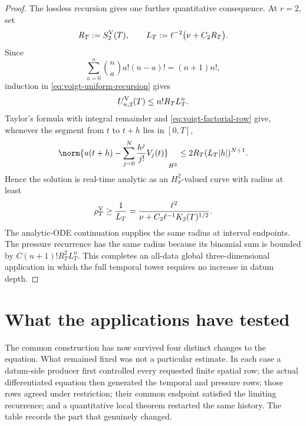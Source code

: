 \begin{proof}
The lossless recursion gives one further quantitative consequence.  At
\(r=2\), set
\begin{equation}
 R_T:=S_2^{\rm V}(T),
 \qquad
 L_T:=\ell^{-2}\bigl(\nu+C_2R_T\bigr).
 \label{eq:voigt-analytic-constants}
\end{equation}
Since
\begin{equation}
 \sum_{a=0}^n\binom na a!(n-a)!=(n+1)n!,
 \label{eq:voigt-binomial-factorial}
\end{equation}
induction in \eqref{eq:voigt-uniform-recursion} gives
\begin{equation}
 U_{n,2}^{\rm V}(T)\le n!R_TL_T^n.
 \label{eq:voigt-factorial-row}
\end{equation}
Taylor's formula with integral remainder and
\eqref{eq:voigt-factorial-row} give, whenever the segment from \(t\) to
\(t+h\) lies in \([0,T]\),
\begin{equation}
 \norm{
 u(t+h)-\sum_{j=0}^{N}\frac{h^j}{j!}V_j(t)
 }_{H^2}
 \le 2R_T(L_T|h|)^{N+1}.
 \label{eq:voigt-taylor-remainder}
\end{equation}
Hence the solution is real-time analytic as an \(H^2_\sigma\)-valued curve
with radius at least
\begin{equation}
 \rho_T^{\rm V}
 \ge\frac1{L_T}
 =\frac{\ell^2}{\nu+C_2\ell^{-1}K_2(T)^{1/2}}.
 \label{eq:voigt-analytic-radius}
\end{equation}
The analytic-ODE continuation supplies the same radius at interval endpoints.
The pressure recurrence has the same radius because its binomial sum is
bounded by \(C(n+1)!R_T^2L_T^n\).  This completes an all-data global
three-dimensional application in which the full temporal tower requires no
increase in datum depth.
\end{proof}

\section{What the applications have tested}
\label{sec:application-comparison}

The common construction has now survived four distinct changes to the
equation.  What remained fixed was not a particular estimate.  In each case a
datum-side producer first controlled every requested finite spatial row; the
actual differentiated equation then generated the temporal and pressure
rows; those rows agreed under restriction; their common endpoint satisfied
the limiting recurrence; and a quantitative local theorem restarted the same
history.  The table records the part that genuinely changed.

